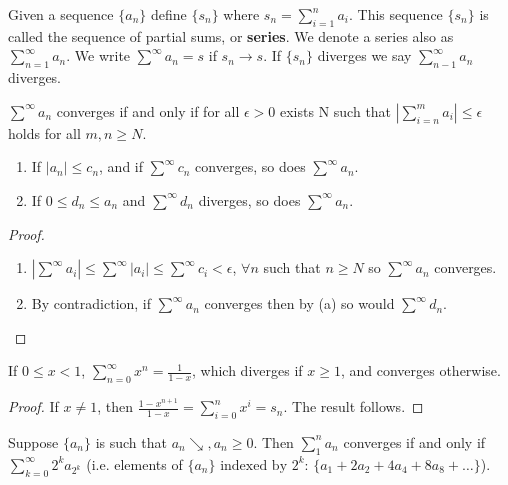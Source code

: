 \documentclass[11pt,fleqn]{book} %
\begin{document}
Given a sequence $\{a_n\}$ define $\{s_n\}$ where $s_n = \sum\limits^n_{i=1} a_i$. This sequence $\{s_n\}$ is called the sequence of partial sums, or \textbf{series}. We denote a series also as $\sum\limits^\infty_{n=1} a_n$. We write $\sum\limits^\infty a_n = s$ if $s_n \rightarrow s$. If $\{s_n\}$ diverges we say $\sum\limits^\infty_{n-1} a_n$ diverges.

\begin{theorem}
	$\sum\limits^\infty a_n$ converges if and only if for all $\epsilon > 0$ exists N such that $|\sum\limits^m_{i=n} a_i| \le \epsilon$ holds for all $m,n \ge N$.  
\end{theorem}

\begin{theorem}
	\begin{enumerate}[label = \alph*)]
		\item If $|a_n| \le c_n$, and if $\sum\limits^\infty c_n$ converges, so does $\sum\limits^\infty a_n$.
		\item If $0 \le d_n \le a_n$ and $\sum\limits^\infty d_n$ diverges, so does $\sum\limits^\infty a_n$.
	\end{enumerate}
\end{theorem}

\begin{proof}
	\begin{enumerate}[label = \alph*)]
		\item $|\sum\limits^\infty a_i| \le \sum\limits^\infty |a_i| \le \sum\limits^\infty c_i < \epsilon$, $\forall n$ such that $n \ge N$ so $\sum\limits^\infty a_n$ converges.
		\item By contradiction, if $\sum\limits^\infty a_n$ converges then by (a) so would $\sum\limits^\infty d_n$.
	\end{enumerate}
\end{proof}

\begin{theorem}
	If $0 \le x < 1$, $\sum\limits^\infty_{n=0} x^n = \frac{1}{1-x}$, which diverges if $x \ge 1$, and converges otherwise.
\end{theorem}

\begin{proof}
	If $x \neq 1$, then $\frac{1-x^{n+1}}{1-x} = \sum\limits^n_{i=0} x^i = s_n$. The result follows.
\end{proof}

\begin{lemma}
	Suppose $\{a_n\}$ is such that $a_n \searrow, a_n \ge 0$. Then $\sum\limits^n_1 a_n$ converges if and only if $\sum\limits^\infty_{k=0} 2^k a_{2^k}$ (i.e. elements of $\{a_n\}\text{ indexed by }2^k$: $\{a_1 + 2 a_2 + 4 a_4 + 8 a_8 + \dots\}$). 
\end{lemma}
\end{document}
